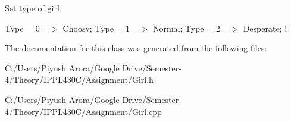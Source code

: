 Set type of girl

Type = 0 =$>$ Choosy; Type = 1 =$>$ Normal; Type = 2 =$>$ Desperate; ! 

The documentation for this class was generated from the following files\+:\begin{DoxyCompactItemize}
\item 
C\+:/\+Users/\+Piyush Arora/\+Google Drive/\+Semester-\/4/\+Theory/\+I\+P\+P\+L430\+C/\+Assignment/Girl.\+h\item 
C\+:/\+Users/\+Piyush Arora/\+Google Drive/\+Semester-\/4/\+Theory/\+I\+P\+P\+L430\+C/\+Assignment/Girl.\+cpp\end{DoxyCompactItemize}
